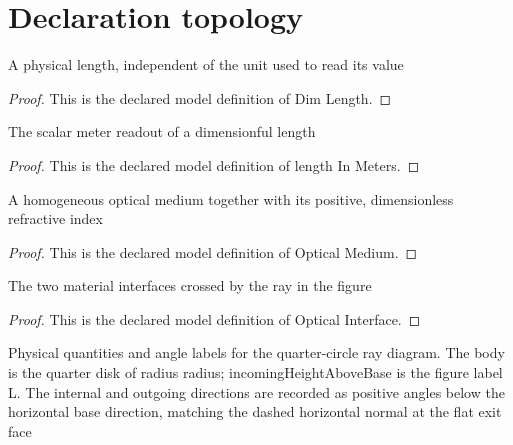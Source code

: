 \section{Declaration topology}
\begin{definition}
  \label{def:physics:phyx-mini-0018:phyxminiproblems-problemphyxmini0018-dimlength}
  A physical length, independent of the unit used to read its value
\end{definition}
\begin{proof}
  This is the declared model definition of Dim Length.
\end{proof}
\begin{definition}
  \label{def:physics:phyx-mini-0018:phyxminiproblems-problemphyxmini0018-lengthinmeters}
  The scalar meter readout of a dimensionful length
\end{definition}
\begin{proof}
  This is the declared model definition of length In Meters.
\end{proof}
\begin{definition}
  \label{def:physics:phyx-mini-0018:phyxminiproblems-problemphyxmini0018-opticalmedium}
  A homogeneous optical medium together with its positive, dimensionless refractive index
\end{definition}
\begin{proof}
  This is the declared model definition of Optical Medium.
\end{proof}
\begin{definition}
  \label{def:physics:phyx-mini-0018:phyxminiproblems-problemphyxmini0018-opticalinterface}
  The two material interfaces crossed by the ray in the figure
\end{definition}
\begin{proof}
  This is the declared model definition of Optical Interface.
\end{proof}
\begin{definition}
  \label{def:physics:phyx-mini-0018:phyxminiproblems-problemphyxmini0018-quartercirclerefractionsetup}
  Physical quantities and angle labels for the quarter-circle ray diagram. The body is the quarter disk of radius radius; incomingHeightAboveBase is the figure label L. The internal and outgoing directions are recorded as positive angles below the horizontal base direction, matching the dashed horizontal normal at the flat exit face
\end{definition}
